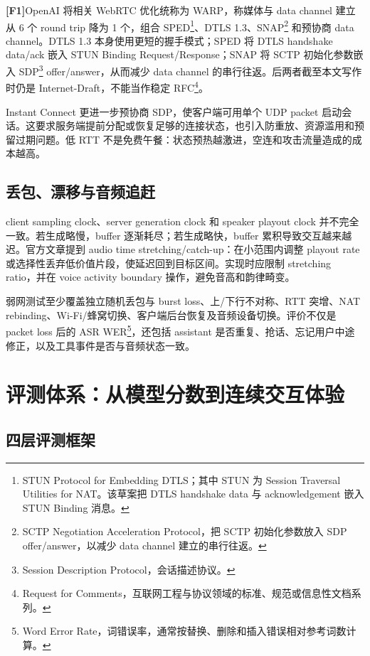\documentclass[UTF8,fontset=none,a4paper,10pt]{ctexart}
\newcommand{\FOne}{\textcolor{official}{\textbf{[F1]}}}
\begin{document}
\FOne OpenAI 将相关 WebRTC 优化统称为 WARP，称媒体与 data channel 建立从 6 个 round trip 降为 1 个，组合 SPED\footnote{STUN Protocol for Embedding DTLS；其中 STUN 为 Session Traversal Utilities for NAT。该草案把 DTLS handshake data 与 acknowledgement 嵌入 STUN Binding 消息。}、DTLS 1.3、SNAP\footnote{SCTP Negotiation Acceleration Protocol，把 SCTP 初始化参数放入 SDP offer/answer，以减少 data channel 建立的串行往返。} 和预协商 data channel\cite{zh:openai2026continuous}。DTLS 1.3 本身使用更短的握手模式\cite{zh:rescorla2022dtls13}；SPED 将 DTLS handshake data/ack 嵌入 STUN Binding Request/Response；SNAP 将 SCTP 初始化参数嵌入 SDP\footnote{Session Description Protocol，会话描述协议。} offer/answer，从而减少 data channel 的串行往返\cite{zh:hancke2026sped,zh:hancke2026snap}。后两者截至本文写作时仍是 Internet-Draft，不能当作稳定 RFC\footnote{Request for Comments，互联网工程与协议领域的标准、规范或信息性文档系列。}。

Instant Connect 更进一步预协商 SDP，使客户端可用单个 UDP packet 启动会话\cite{zh:openai2026continuous}。这要求服务端提前分配或恢复足够的连接状态，也引入防重放、资源滥用和预留过期问题。低 RTT 不是免费午餐：状态预热越激进，空连和攻击流量造成的成本越高。

\subsection{丢包、漂移与音频追赶}

client sampling clock、server generation clock 和 speaker playout clock 并不完全一致。若生成略慢，buffer 逐渐耗尽；若生成略快，buffer 累积导致交互越来越迟。官方文章提到 audio time stretching/catch-up\cite{zh:openai2026continuous}：在小范围内调整 playout rate 或选择性丢弃低价值片段，使延迟回到目标区间。实现时应限制 stretching ratio，并在 voice activity boundary 操作，避免音高和韵律畸变。

弱网测试至少覆盖独立随机丢包与 burst loss、上/下行不对称、RTT 突增、NAT rebinding、Wi-Fi/蜂窝切换、客户端后台恢复及音频设备切换。评价不仅是 packet loss 后的 ASR WER\footnote{Word Error Rate，词错误率，通常按替换、删除和插入错误相对参考词数计算。}，还包括 assistant 是否重复、抢话、忘记用户中途修正，以及工具事件是否与音频状态一致。

\section{评测体系：从模型分数到连续交互体验}

\subsection{四层评测框架}
\end{document}
